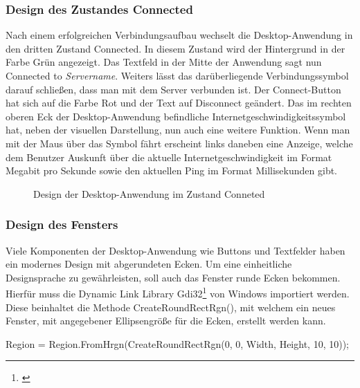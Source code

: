 \subsubsection{Design des Zustandes Connected}

Nach einem erfolgreichen Verbindungsaufbau wechselt die Desktop-Anwendung in den dritten Zustand Connected. In diesem Zustand wird der Hintergrund in der Farbe Grün angezeigt. Das Textfeld in der Mitte der Anwendung sagt nun Connected to \textit{Servername}. Weiters lässt das darüberliegende Verbindungssymbol darauf schließen, dass man mit dem Server verbunden ist. Der Connect-Button hat sich auf die Farbe Rot und der Text auf Disconnect geändert. Das im rechten oberen Eck der Desktop-Anwendung befindliche Internetgeschwindigkeitssymbol hat, neben der visuellen Darstellung, nun auch eine weitere Funktion. Wenn man mit der Maus über das Symbol fährt erscheint links daneben eine Anzeige, welche dem Benutzer Auskunft über die aktuelle Internetgeschwindigkeit im Format Megabit pro Sekunde sowie den aktuellen Ping im Format Millisekunden gibt.
\\
\begin{figure}[H]
    \centering
    \setlength{\fboxsep}{1pt}
	\setlength{\fboxrule}{1pt}
    \caption{Design der Desktop-Anwendung im Zustand Conneted} 
\end{figure}

\subsubsection{Design des Fensters}

Viele Komponenten der Desktop-Anwendung wie Buttons und Textfelder haben ein modernes Design mit abgerundeten Ecken. Um eine einheitliche Designsprache zu gewährleisten, soll auch das Fenster runde Ecken bekommen. Hierfür muss die Dynamic Link Library Gdi32\footnote[1]{\cite[Vgl.][]{GDI}} von Windows importiert werden. Diese beinhaltet die Methode \mbox{CreateRoundRectRgn()}, mit welchem ein neues Fenster, mit angegebener Ellipsengröße für die Ecken, erstellt werden kann.

\begin{program}[H]
\begin{CSharpCode}
Region = Region.FromHrgn(CreateRoundRectRgn(0, 0, Width, Height, 10, 10));
\end{CSharpCode}
\caption{Erstellen eines neuen Fensters mit abgerundeten Ecken}
\end{program}

